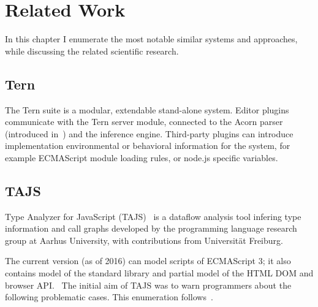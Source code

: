 \chapter{Related Work}
\label{chap:related-work}

In this chapter I enumerate the most notable similar systems and approaches, while discussing the related scientific research.

\section{Tern}

The Tern suite is a modular, extendable stand-alone system. Editor plugins communicate with the Tern server module, connected to the Acorn parser (introduced in~) and the inference engine. Third-party plugins can introduce implementation environmental or behavioral information for the system, for example ECMAScript module loading rules, or node.js specific variables.~\cite{tern-docs}


\section{TAJS}
Type Analyzer for JavaScript (TAJS)~\cite{tajs} is a dataflow analysis tool infering type information and call graphs developed by the programming language research group at Aarhus University, with contributions from Universität Freiburg.

The current version (as of 2016) can model scripts of ECMAScript 3; it also contains model of the standard library and partial model of the HTML DOM and browser API.~\cite{tajs-git} The initial aim of TAJS was to warn programmers about the following problematic cases. This enumeration follows~\cite{jensen_type_2009}.

